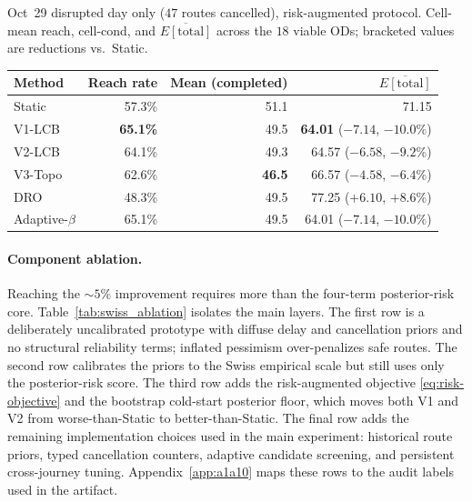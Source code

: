 \documentclass[opre,dblanonrev]{informs4}
\begin{document}
\begin{table}
\TABLE
{Oct~29 disrupted day only ($47$ routes cancelled), risk-augmented
protocol. Cell-mean reach, cell-cond, and
$\overline{E[\mathrm{total}]}$ across the $18$ viable ODs;
bracketed values are reductions vs.\ Static.\label{tab:swiss_oct29}}
{\begin{tabular}{l rrr}
\toprule
Method        & Reach rate & Mean (completed) & $\overline{E[\mathrm{total}]}$ \\
\midrule
Static            & 57.3\% & 51.1 & 71.15 \\
V1-LCB            & \textbf{65.1\%} & 49.5 & \textbf{64.01} ($-7.14$, $-10.0\%$) \\
V2-LCB            & 64.1\% & 49.3 & 64.57 ($-6.58$, $-9.2\%$) \\
V3-Topo           & 62.6\% & \textbf{46.5} & 66.57 ($-4.58$, $-6.4\%$) \\
DRO               & 48.3\% & 49.5 & 77.25 ($+6.10$, $+8.6\%$) \\
Adaptive-$\beta$  & 65.1\% & 49.5 & 64.01 ($-7.14$, $-10.0\%$) \\
\bottomrule
\end{tabular}}
{}
\end{table}

\paragraph{Component ablation.} Reaching the $\sim\!5\%$ improvement
requires more than the four-term posterior-risk core. Table~\ref{tab:swiss_ablation}
isolates the main layers. The first row is a deliberately
uncalibrated prototype with diffuse delay and cancellation priors and
no structural reliability terms; inflated pessimism over-penalizes
safe routes. The second row calibrates the priors to the Swiss
empirical scale but still uses only the posterior-risk score. The
third row adds the risk-augmented objective
\eqref{eq:risk-objective} and the bootstrap cold-start posterior
floor, which moves both V1 and V2 from worse-than-Static to
better-than-Static. The final row adds the remaining implementation
choices used in the main experiment: historical route priors, typed
cancellation counters, adaptive candidate screening, and persistent
cross-journey tuning. Appendix~\ref{app:a1a10} maps these rows to the
audit labels used in the artifact.
\end{document}
